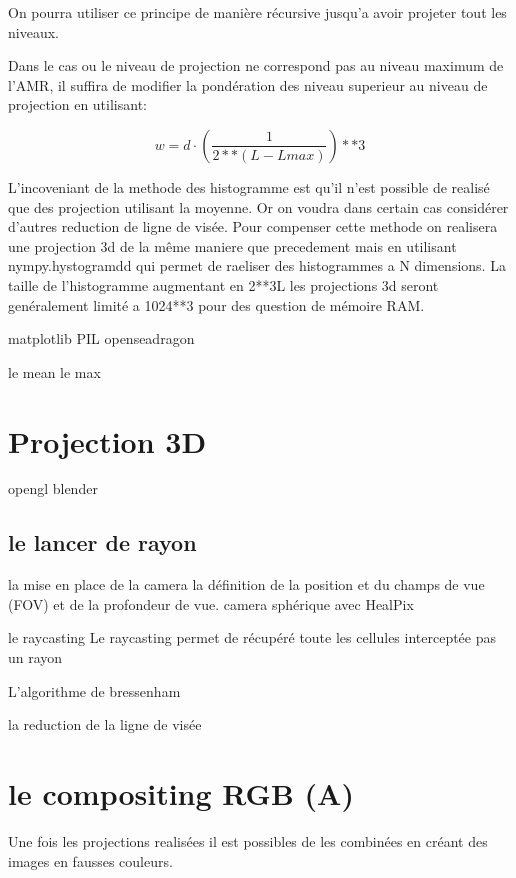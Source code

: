 On pourra utiliser ce principe de manière récursive jusqu'a avoir projeter tout les niveaux.

Dans le cas ou le niveau de projection ne correspond pas au niveau maximum de l'AMR, il suffira de modifier la pondération des niveau superieur au niveau de projection en utilisant:

\begin{equation}
w = d \cdot \left( \frac{1}{2**(L-Lmax) }\right) **3
\end{equation}



L'incoveniant de la methode des histogramme est qu'il n'est possible de realisé que des projection utilisant la moyenne.
Or on voudra dans certain cas considérer d'autres reduction de ligne de visée.
Pour compenser cette methode on realisera une projection 3d de la même maniere que precedement mais en utilisant nympy.hystogramdd qui permet de raeliser des histogrammes a N dimensions.
La taille de l'histogramme augmentant en 2**3L les projections 3d seront genéralement limité a 1024**3 pour des question de mémoire RAM. 





matplotlib
PIL
openseadragon


le mean
le max







\section{Projection 3D}
opengl
blender

\subsection{le lancer de rayon}

la mise en place de la camera
la définition de la position et du champs de vue (FOV) et de la profondeur de vue.
camera sphérique avec HealPix


le raycasting 
Le raycasting permet de récupéré toute les cellules interceptée pas un rayon

L'algorithme de bressenham


la reduction de la ligne de visée


\section{le compositing RGB (A)}
Une fois les projections realisées il est possibles de les combinées en créant des images en fausses couleurs.


